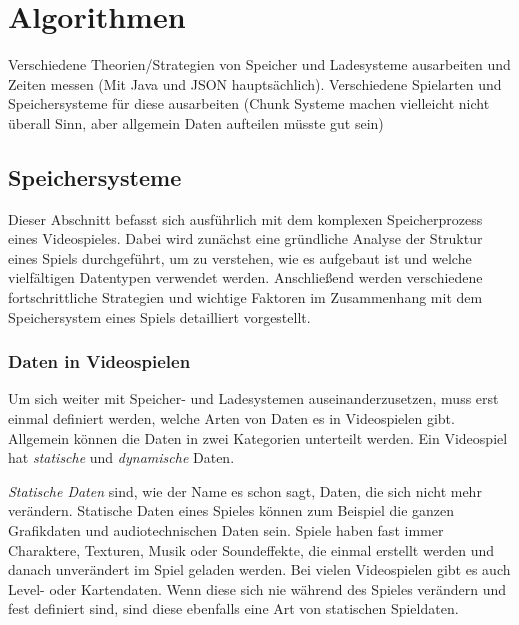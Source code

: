 \chapter{Algorithmen}\label{ch:algorithmen}
Verschiedene Theorien/Strategien von Speicher und Ladesysteme ausarbeiten und Zeiten messen (Mit Java und JSON hauptsächlich). Verschiedene Spielarten und Speichersysteme für diese ausarbeiten (Chunk Systeme machen vielleicht nicht überall Sinn, aber allgemein Daten aufteilen müsste gut sein)





\section{Speichersysteme}\label{sect:speichersysteme}
Dieser Abschnitt befasst sich ausführlich mit dem komplexen Speicherprozess eines Videospieles. Dabei wird zunächst eine gründliche Analyse der Struktur eines Spiels durchgeführt, um zu verstehen, wie es aufgebaut ist und welche vielfältigen Datentypen verwendet werden. Anschließend werden verschiedene fortschrittliche Strategien und wichtige Faktoren im Zusammenhang mit dem Speichersystem eines Spiels detailliert vorgestellt.



\subsection{Daten in Videospielen}
Um sich weiter mit Speicher- und Ladesystemen auseinanderzusetzen, muss erst einmal definiert werden, welche Arten von Daten es in Videospielen gibt. Allgemein können die Daten in zwei Kategorien unterteilt werden. Ein Videospiel hat \textit{statische} und \textit{dynamische} Daten.

\textit{Statische Daten} sind, wie der Name es schon sagt, Daten, die sich nicht mehr verändern. Statische Daten eines Spieles können zum Beispiel die ganzen Grafikdaten und audiotechnischen Daten sein. Spiele haben fast immer Charaktere, Texturen, Musik oder Soundeffekte, die einmal erstellt werden und danach unverändert im Spiel geladen werden. Bei vielen Videospielen gibt es auch Level- oder Kartendaten. Wenn diese sich nie während des Spieles verändern und fest definiert sind, sind diese ebenfalls eine Art von statischen Spieldaten. 

